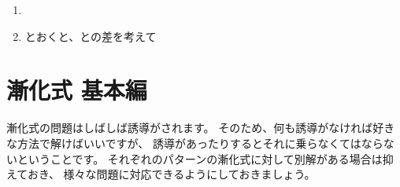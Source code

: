 \documentclass[a4paper]{ltjsarticle}
\begin{document}
\begin{question*}
\begin{ans*}
\begin{enumerate}[label=\arabic*.]
  \item
  \item {}とおくと、との差を考えて
\end{enumerate}
\end{ans*}
\end{question*}


\newpage
\section{漸化式 基本編}

漸化式の問題はしばしば誘導がされます。
そのため、何も誘導がなければ好きな方法で解けばいいですが、
誘導があったりするとそれに乗らなくてはならないということです。
それぞれのパターンの漸化式に対して別解がある場合は抑えておき、
様々な問題に対応できるようにしておきましょう。
\end{document}
